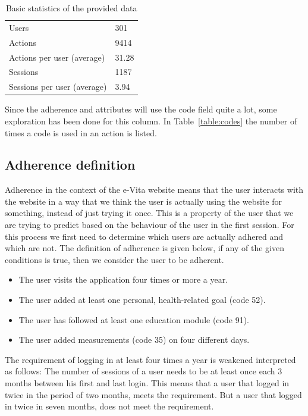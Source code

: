 \begin{table}[]
	\centering
	\caption{Basic statistics of the provided data}
	\label{table:dataStats}
	\begin{tabular}{@{}ll@{}}
		\toprule
		Users                       & 301   \\
		Actions                     & 9414  \\
		Actions per user (average)  & 31.28 \\
		Sessions                    & 1187  \\
		Sessions per user (average) & 3.94  \\ \bottomrule
	\end{tabular}
\end{table}

Since the adherence and attributes will use the code field quite a lot, some exploration has been done for this column. In Table~\ref{table:codes} the number of times a code is used in an action is listed.

\subsection{Adherence definition}
Adherence in the context of the e-Vita website means that the user interacts with the website in a way that we think the user is actually using the website for something, instead of just trying it once. This is a property of the user that we are trying to predict based on the behaviour of the user in the first session. For this process we first need to determine which users are actually adhered and which are not. The definition of adherence is given below, if any of the given conditions is true, then we consider the user to be adherent.

\begin{itemize}
	\item The user visits the application four times or more a year.
	\item The user added at least one personal, health-related goal (code 52).
	\item The user has followed at least one education module (code 91).
	\item The user added measurements (code 35) on four different days.
\end{itemize}

The requirement of logging in at least four times a year is weakened interpreted as follows: The number of sessions of a user needs to be at least once each 3 months between his first and last login. This means that a user that logged in twice in the period of two months, meets the requirement. But a user that logged in twice in seven months, does not meet the requirement. 

